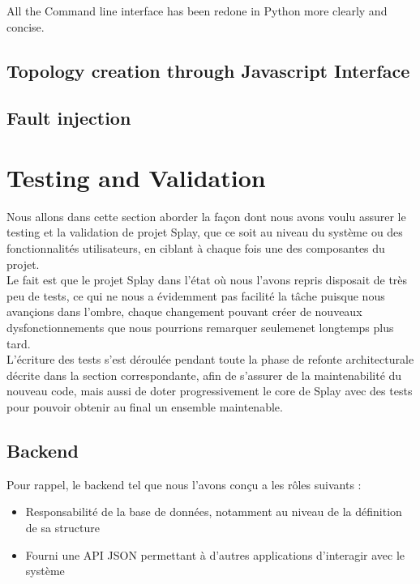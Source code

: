 \documentclass{eplmastersthesis}
\begin{document}
      All the Command line interface has been redone in Python more clearly and concise.

    \section{Topology creation through Javascript Interface}

    \section{Fault injection}



  \chapter{Testing and Validation}

    Nous allons dans cette section aborder la façon dont nous avons voulu assurer
    le testing et la validation de projet Splay, que ce soit au niveau du système
    ou des fonctionnalités utilisateurs, en ciblant à chaque fois une des
    composantes du projet.\\

    Le fait est que le projet Splay dans l'état où nous l'avons repris disposait
    de très peu de tests, ce qui ne nous a évidemment pas facilité la tâche puisque
    nous avançions dans l'ombre, chaque changement pouvant créer de nouveaux
    dysfonctionnements que nous pourrions remarquer seulemenet longtemps plus tard.\\

    L'écriture des tests s'est déroulée pendant toute la phase de refonte
    architecturale décrite dans la section correspondante, afin de s'assurer
    de la maintenabilité du nouveau code, mais aussi de doter progressivement
    le core de Splay avec des tests pour pouvoir obtenir au final un ensemble
    maintenable.\\

    \section{Backend}

      Pour rappel, le backend tel que nous l'avons conçu a les rôles suivants :
      \begin{itemize}
        \item Responsabilité de la base de données, notamment au niveau de
        la définition de sa structure
        \item Fourni une API JSON permettant à d'autres applications d'interagir
        avec le système
      \end{itemize}
\end{document}
